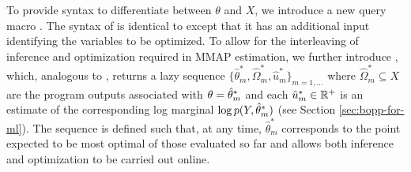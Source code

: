 To provide syntax to differentiate between $\theta$ and $X$, we introduce a new query macro .  The syntax of  is identical to  except that it has an additional input identifying the variables to be optimized.  To allow for the interleaving of inference and optimization required in MMAP estimation, we further introduce \doopt, which, analogous to \doquery, returns a lazy sequence $\{\hat{\theta}^*_m,\hat{\Omega}^*_m,\hat{u}^*_m\}_{m=1,\dots}$ where $\hat{\Omega}^*_m \subseteq X$ are the program outputs associated with $\theta=\hat{\theta}^*_m$ and each $\hat{u}^*_m \in \mathbb{R}^+$ is an estimate of the corresponding log marginal $\log p(Y, \hat{\theta}_m^*)$ (see Section \ref{sec:bopp-for-ml}).  The sequence is defined such that, at any time, $\hat{\theta}^*_m$ corresponds to the point expected to be most optimal of those evaluated so far and allows both inference and optimization to be carried out online.


